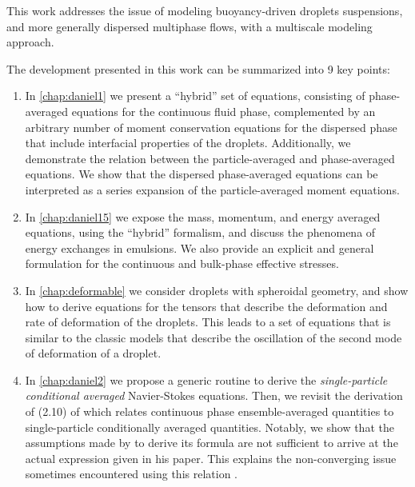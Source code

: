 
This work addresses the issue of modeling buoyancy-driven droplets suspensions, and more generally dispersed multiphase flows, with a multiscale modeling approach. 

The development presented in this work can be summarized into 9 key points:
\begin{enumerate}
    \item 
    In \ref{chap:daniel1} we present a ``hybrid'' set of equations, consisting of phase-averaged equations for the continuous fluid phase, complemented by an arbitrary number of moment conservation equations for the dispersed phase that include interfacial properties of the droplets.
    Additionally, we demonstrate the relation between the particle-averaged and phase-averaged equations. 
    We show that the dispersed phase-averaged equations can be interpreted as a series expansion of the particle-averaged moment equations. 
    \item In \ref{chap:daniel15} we expose the mass, momentum, and energy averaged equations, using the ``hybrid'' formalism, and discuss the phenomena of energy exchanges in emulsions.
    We also provide an explicit and general formulation for the continuous and bulk-phase effective stresses.
    \item In \ref{chap:deformable} we consider droplets with spheroidal geometry, and show how to derive equations for the tensors that describe the deformation and rate of deformation of the droplets. 
    This leads to a set of equations that is similar to the classic models that describe the oscillation of the second mode of deformation of a droplet.
    \item     
    In \ref{chap:daniel2} we propose a generic routine to derive the \textit{single-particle conditional averaged} Navier-Stokes equations. 
    Then, we revisit the derivation of (2.10) of \citet{batchelor1972sedimentation} which relates continuous phase ensemble-averaged quantities to single-particle conditionally averaged quantities.
    Notably, we show that the assumptions made by \citet{batchelor1972sedimentation} to derive its formula are not sufficient to arrive at the actual expression given in his paper.
    This explains the non-converging issue sometimes encountered using this relation \citep{batchelor1972sedimentation}. 

\end{enumerate}
